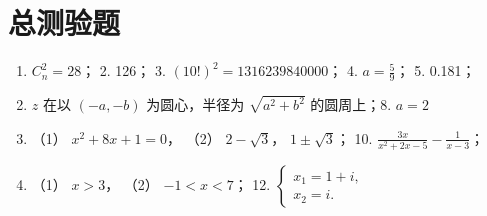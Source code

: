\section{总测验题}

\begin{enumerate}
\item
  \(C_{n}^{2} = 28\)； 2. 126； 3. \((10!)^{2} = 1316239840000\)； 4.
  \(a = \frac{5}{9}\)； 5. 0.181；
\item
  \(z\) 在以 \((-a, -b)\) 为圆心，半径为 \(\sqrt{a^2 + b^2}\)
  的圆周上；8. \(a = 2\)
\item
  （1） \(x^{2} + 8x + 1 = 0\)， （2） \(2 - \sqrt{3}\)，
  \(1 \pm \sqrt{3}\)； 10.
  \(\frac{3x}{x^2 + 2x - 5} - \frac{1}{x - 3}\)；
\item
  （1） \(x > 3\)， （2） \(-1 < x < 7\)； 12.
  \(\left\{ \begin{array}{l} x_1=1+i, \\ x_2 = i. \end{array} \right.\)
\end{enumerate}
